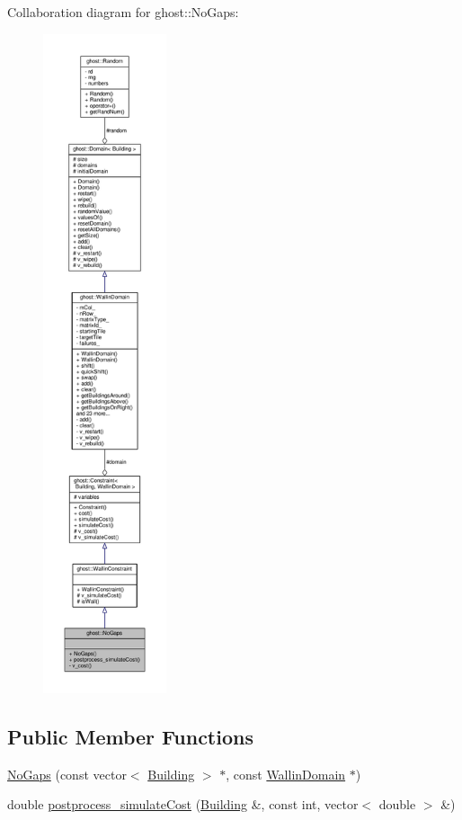 Collaboration diagram for ghost\-:\-:No\-Gaps\-:
\nopagebreak
\begin{figure}[H]
\begin{center}
\leavevmode
\includegraphics[height=550pt]{classghost_1_1NoGaps__coll__graph}
\end{center}
\end{figure}
\subsection*{Public Member Functions}
\begin{DoxyCompactItemize}
\item 
\hyperlink{classghost_1_1NoGaps_a3f3cbd41ad60c54f6030dd5203a25610}{No\-Gaps} (const vector$<$ \hyperlink{classghost_1_1Building}{Building} $>$ $\ast$, const \hyperlink{classghost_1_1WallinDomain}{Wallin\-Domain} $\ast$)
\item 
double \hyperlink{classghost_1_1NoGaps_a65b1ce5aa567ad8c67b184cec8f320ac}{postprocess\-\_\-simulate\-Cost} (\hyperlink{classghost_1_1Building}{Building} \&, const int, vector$<$ double $>$ \&)
\end{DoxyCompactItemize}
